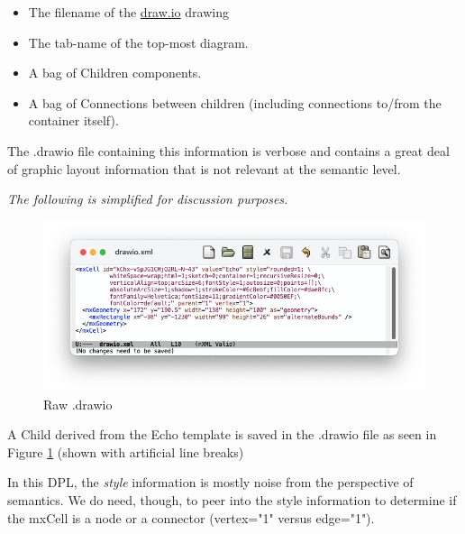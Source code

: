 \documentclass[10pt,anonymous,review]{acmart}
\begin{document}
\begin{itemize}
\item The filename of the \href{http://draw.io}{draw.io} drawing

\item The tab-name of the top-most diagram.

\item A bag of Children components.

\item A bag of Connections between children (including connections to/from the container itself).

\end{itemize}

\newpage

The .drawio file containing this information is verbose and contains a great deal of graphic layout information that is not relevant at the semantic level.

\emph{The following is simplified for discussion purposes.}
\vspace{1\baselineskip}

  \begin{figure}[h]
    \centering
    \includegraphics[trim=1cm 1.9cm 1.5cm 1cm, clip, scale=0.4]{./media/drawio1.png}
    \caption{Raw .drawio}
    \label{drawio1}
\end{figure}

A Child derived from the Echo template is saved in the .drawio file as seen in Figure \ref{drawio1} (shown with artificial line breaks)

In this DPL, the \emph{style} information is mostly noise from the perspective of semantics. We do need, though, to peer into the style information to determine if the mxCell is a node or a connector (vertex="1" versus edge="1").
\end{document}

